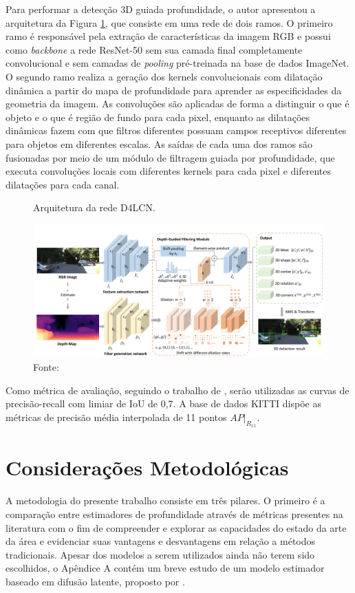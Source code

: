 Para performar a detecção 3D guiada profundidade, o autor apresentou a arquitetura da Figura \ref{fig:d4lcn}, que consiste em uma rede de dois ramos. O primeiro ramo é responsável pela extração de características da imagem RGB e possui como \textit{backbone} a rede ResNet-50 sem sua camada final completamente convolucional e sem camadas de \textit{pooling} pré-treinada na base de dados ImageNet. O segundo ramo realiza a geração dos kernels convolucionais com dilatação dinâmica a partir do mapa de profundidade para aprender as especificidades da geometria da imagem. As convoluções são aplicadas de forma a distinguir o que é objeto e o que é região de fundo para cada pixel, enquanto as dilatações dinâmicas fazem com que filtros diferentes possuam campos receptivos diferentes para objetos em diferentes escalas. As saídas de cada uma dos ramos são fusionadas por meio de um módulo de filtragem guiada por profundidade, que executa convoluções locais com diferentes kernels para cada pixel e diferentes dilatações para cada canal. 




\begin{figure}[H]
    \centering
    \caption{Arquitetura da rede D4LCN. }
    \includegraphics[width=\textwidth]{fig/d4lcn.png}
    \caption*{Fonte: }
    \label{fig:d4lcn}
\end{figure}

Como métrica de avaliação, seguindo o trabalho de , serão utilizadas as curvas de precisão-recall com limiar de IoU de 0,7. A base de dados KITTI dispõe as métricas de precisão média interpolada de 11 pontos $AP|_{R_{11}}$.

\section{Considerações Metodológicas}

A metodologia do presente trabalho consiste em três pilares. O primeiro é a comparação entre estimadores de profundidade através de métricas presentes na literatura com o fim de compreender e explorar as capacidades do estado da arte da área e evidenciar suas vantagens e desvantagens em relação a métodos tradicionais. Apesar dos modelos a serem utilizados ainda não terem sido escolhidos, o Apêndice A contém um breve estudo de um modelo estimador baseado em difusão latente, proposto por .

